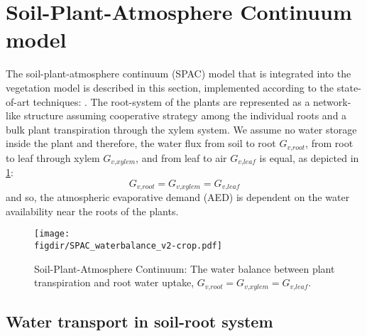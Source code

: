 \section{Soil-Plant-Atmosphere Continuum model}
\label{sec:spac}

The soil-plant-atmosphere continuum (SPAC) model that is integrated into the vegetation model is described in this section, implemented according to the state-of-art techniques: \citep{Volpe2013,Manoli2014,Launiainen2015,Idso1977,Manzoni2011,Farquhar1980}. The root-system of the plants are represented as a network-like structure assuming cooperative strategy among the individual roots and a bulk plant transpiration through the xylem system. We assume no water storage inside the plant and therefore, the water flux from soil to root $G_{\textit{v,root}}$, from root to leaf through xylem $G_{\textit{v,xylem}}$, and from leaf to air $G_{\textit{v,leaf}}$ is equal, as depicted in \cref{fig:SPAC_waterbalance}:
\begin{equation}
G_{\textit{v,root}} = G_{\textit{v,xylem}} = G_{\textit{v,leaf}}
\label{eq:massfluxeq}
\end{equation}
and so, the atmospheric evaporative demand (AED) is dependent on the water availability near the roots of the plants.

\begin{figure}[t]
	\centering
	\texttt{[image: \\figdir/SPAC\_waterbalance\_v2-crop.pdf]}
	\caption{Soil-Plant-Atmosphere Continuum: The water balance between plant transpiration and root water uptake, $G_{\textit{v,root}} = G_{\textit{v,xylem}} = G_{\textit{v,leaf}}$.}
	\label{fig:SPAC_waterbalance}
\end{figure}

\subsection{Water transport in soil-root system}

